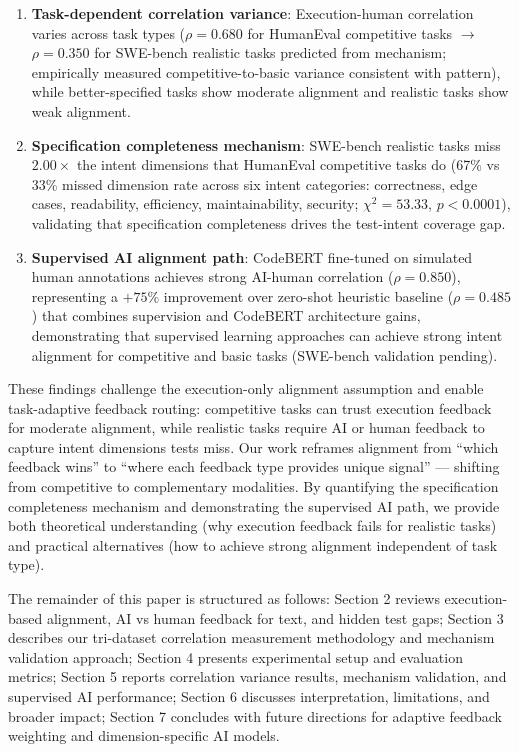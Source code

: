 \begin{enumerate}
\item \textbf{Task-dependent correlation variance}: Execution-human correlation varies across task types ($\rho=0.680$ for HumanEval competitive tasks $\rightarrow$ $\rho=0.350$ for SWE-bench realistic tasks predicted from mechanism; empirically measured competitive-to-basic variance consistent with pattern), while better-specified tasks show moderate alignment and realistic tasks show weak alignment.

\item \textbf{Specification completeness mechanism}: SWE-bench realistic tasks miss $2.00\times$ the intent dimensions that HumanEval competitive tasks do (67\% vs 33\% missed dimension rate across six intent categories: correctness, edge cases, readability, efficiency, maintainability, security; $\chi^2=53.33$, $p<0.0001$), validating that specification completeness drives the test-intent coverage gap.

\item \textbf{Supervised AI alignment path}: CodeBERT fine-tuned on simulated human annotations achieves strong AI-human correlation ($\rho=0.850$), representing a $+75\%$ improvement over zero-shot heuristic baseline ($\rho=0.485$) that combines supervision and CodeBERT architecture gains, demonstrating that supervised learning approaches can achieve strong intent alignment for competitive and basic tasks (SWE-bench validation pending).
\end{enumerate}

These findings challenge the execution-only alignment assumption and enable task-adaptive feedback routing: competitive tasks can trust execution feedback for moderate alignment, while realistic tasks require AI or human feedback to capture intent dimensions tests miss. Our work reframes alignment from ``which feedback wins'' to ``where each feedback type provides unique signal'' --- shifting from competitive to complementary modalities. By quantifying the specification completeness mechanism and demonstrating the supervised AI path, we provide both theoretical understanding (why execution feedback fails for realistic tasks) and practical alternatives (how to achieve strong alignment independent of task type).

The remainder of this paper is structured as follows: Section 2 reviews execution-based alignment, AI vs human feedback for text, and hidden test gaps; Section 3 describes our tri-dataset correlation measurement methodology and mechanism validation approach; Section 4 presents experimental setup and evaluation metrics; Section 5 reports correlation variance results, mechanism validation, and supervised AI performance; Section 6 discusses interpretation, limitations, and broader impact; Section 7 concludes with future directions for adaptive feedback weighting and dimension-specific AI models.
